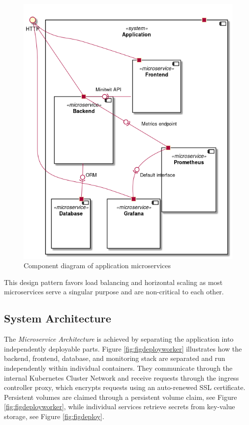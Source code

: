 \begin{figure}[H]
    \centering
    \includegraphics[scale=.43]{images/microservices-components.png}
    \caption{Component diagram of application microservices}
    \label{fig:microservices}
\end{figure}

This design pattern favors load balancing and horizontal scaling as most microservices serve a singular purpose and are non-critical to each other.

\subsection{System Architecture}
\label{subsec:system_architecture}
The \textit{Microservice Architecture} is achieved by separating the application into independently deployable parts. Figure \ref{fig:figdeployworker} illustrates how the backend, frontend, database, and monitoring stack are separated and run independently within individual containers. 
They communicate through the internal Kubernetes Cluster Network and receive requests through the ingress controller proxy, which encrypts requests using an auto-renewed SSL certificate. 
Persistent volumes are claimed through a persistent volume claim, see Figure \ref{fig:figdeployworker}, while individual services retrieve secrets from key-value storage, see  Figure \ref{fig:figdeploy}.

